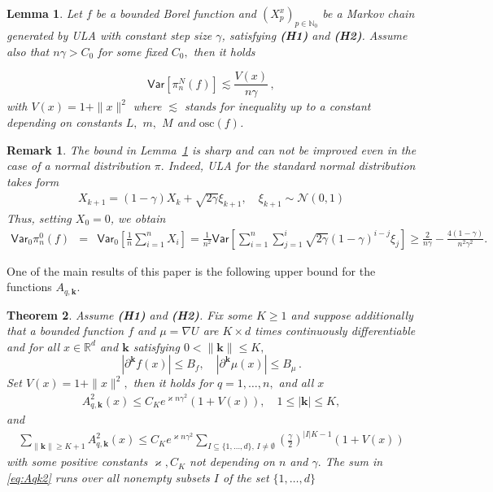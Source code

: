 \documentclass[bj]{imsart}
\def\PVar{\mathsf{Var}}
\def\nset{\mathbb{N}}
\newtheorem{thm}{Theorem}
\newtheorem{lem}[thm]{Lemma}
\newtheorem{remark}{Remark}
\def\eqsp{\,}
\begin{document}
\begin{lem} 
\label{lem:variance}
Let $f$ be a bounded Borel function and $(X^x_{p})_{p \in \nset_0}$ be a Markov chain generated by ULA with constant step size $\gamma$, satisfying {\bf (H1)} and {\bf (H2)}. Assume also that $n\gamma > C_0$ for some fixed $C_0,$ then it holds

\begin{equation}
\label{eq:var-mc}
\PVar[\pi_n^N(f)]\lesssim \frac{V(x)}{n\gamma} \eqsp,
\end{equation}
with $V(x) = 1+ \|x\|^2$ where $\lesssim$ stands for inequality up to a constant depending on constants $L,$ $m,$  $M$ and $\mathrm{osc}(f)$.
\end{lem}
\begin{remark}
\label{rem:var-low}
The bound in Lemma~\ref{lem:variance} is sharp and can not be improved even in the case of a normal distribution $\pi.$
Indeed,  ULA for the standard normal distribution takes form
\begin{eqnarray*}
X_{k+1} = (1-\gamma)X_k + \sqrt{2\gamma}\xi_{k+1},\quad \xi_{k+1} \sim \mathcal{N}(0,1)
\end{eqnarray*}
Thus, setting $X_0 = 0$, we obtain
\begin{eqnarray*}
\PVar_{0} \pi_n^0(f) &=& \PVar_{0}\left[\frac{1}{n}\sum\limits_{i=1}^{n}X_i\right] 
= \frac{1}{n^2}\PVar\left[\sum\limits_{i=1}^{n}\sum\limits_{j=1}^{i}\sqrt{2\gamma}(1-\gamma)^{i-j}\xi_{j}\right]
\geq  \frac{2}{n\gamma} - \frac{4(1-\gamma)}{n^2\gamma^2}.
\end{eqnarray*}
\end{remark}
One of the main results of this paper is the following  upper bound for the functions $A_{q,\mathbf{k}}.$
\begin{thm}\label{th:mr}
Assume {\bf (H1)} and {\bf (H2)}.
Fix some $K\geq 1$ and suppose additionally that a bounded function $f$ and $\mu=\nabla U$ are $K \times d $ times continuously differentiable
and for all $x\in\mathbb R^d$ and  \(\mathbf{k}\) satisfying \(0<\|\mathbf{k}\|\leq  K,\)
\begin{equation}
\label{eq:smooth-mu}
|\partial^{\mathbf{k}} f(x)|\le  B_f, \quad |\partial^{\mathbf{k}} \mu (x)|\leq B_\mu \eqsp.
\end{equation}
 Set $V(x) = 1 + \|x\|^2,$ then  it holds for $q=1,\ldots,n,$ and all $x$
\begin{eqnarray}
\label{eq:Aqk2}
A^2_{q,\mathbf{k}}(x)\leq C_Ke^{\varkappa n\gamma^2}(1+V(x)),\quad 1\leq |\mathbf{k}|\leq K,
\end{eqnarray}
 and 
\begin{eqnarray}
\label{eq:Aqk2sum}
\sum_{\|\mathbf{k}\|\geq K+1} A^2_{q,\mathbf{k}}(x)\leq C_{K}e^{\varkappa n\gamma^2}\sum_{I\subseteq\{1,\ldots,d\},\, I\neq \emptyset}
\left(\frac{\gamma}{2}\right)^{|I|K-1}
(1+V(x))
\end{eqnarray}
with some positive constants $\varkappa, C_K$ not depending on $n$ and  $\gamma.$  The sum in \eqref{eq:Aqk2} runs over all nonempty subsets $I$ of the set $\{1,\ldots,d\}$ 
\end{thm}
\end{document}
